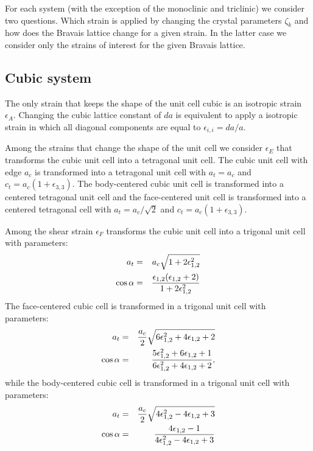 \documentclass[12pt,a4paper]{article}
\begin{document}
For each system (with the exception of the monoclinic and triclinic) 
we consider two questions. Which strain is applied
by changing the crystal parameters $\zeta_k$ and 
how does the Bravais lattice change for a given strain. In the latter
case we consider only the strains of interest for the given Bravais 
lattice.

\subsection{\color{web-blue}Cubic system}
The only strain that keeps the shape of the unit cell cubic is an isotropic
strain $\epsilon_A$.
Changing the cubic lattice constant of $da$ is equivalent to apply a
isotropic strain in which all diagonal components are equal to 
$\epsilon_{i,i} = da / a$.

Among the strains that change the shape of the unit cell we consider
$\epsilon_E$ that transforms the cubic unit cell into a tetragonal unit cell.
The cubic unit cell with edge $a_c$ is transformed into a 
tetragonal unit cell with $a_t=a_c$ and $c_t=a_c(1+\epsilon_{3,3})$.
The body-centered cubic unit cell is transformed into
a centered tetragonal unit cell and the face-centered unit cell is
transformed into a centered tetragonal cell with $a_t=a_c / \sqrt{2}$ 
and $c_t=a_c(1+\epsilon_{3,3})$.

Among the shear strain $\epsilon_F$
transforms the cubic unit cell into a trigonal unit cell with
parameters:
\begin{eqnarray}
a_t&=& a_c \sqrt{1+2\epsilon_{1,2}^2} \\
\cos\alpha &=& {\epsilon_{1,2} (\epsilon_{1,2} + 2) \over 
1 + 2 \epsilon_{1,2}^2 }
\end{eqnarray}
The face-centered cubic cell is transformed in a trigonal unit cell 
with parameters:
\begin{eqnarray}
a_t&=& {a_c \over 2} \sqrt{6 \epsilon_{1,2}^2+4 \epsilon_{1,2} +2} \\
\cos\alpha &=& {5\epsilon_{1,2}^2+ 6\epsilon_{1,2} + 1 \over 
6\epsilon_{1,2}^2 + 4\epsilon_{1,2}+2 },
\end{eqnarray}
while the body-centered cubic cell is transformed in a trigonal unit cell
with parameters:
\begin{eqnarray}
a_t&=& {a_c \over 2} \sqrt{ 4\epsilon_{1,2}^2 - 4\epsilon_{1,2} + 3 } \\
\cos\alpha &=& {4\epsilon_{1,2}-1 \over 4\epsilon_{1,2}^2-4\epsilon_{1,2}+3}
\end{eqnarray}
\end{document}
